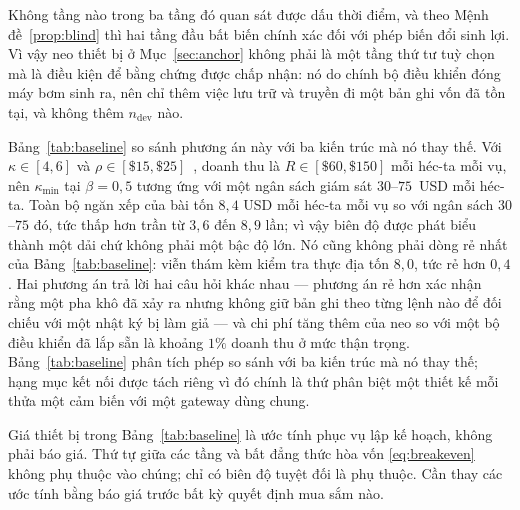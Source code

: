Không tầng nào trong ba tầng đó quan sát được dấu thời điểm, và theo
Mệnh đề~\ref{prop:blind} thì hai tầng đầu bất biến chính xác đối với phép biến đổi sinh
lợi. Vì vậy neo thiết bị ở Mục~\ref{sec:anchor} không phải là một tầng thứ tư tuỳ chọn
mà là điều kiện để bằng chứng được chấp nhận: nó do chính bộ điều khiển đóng máy bơm
sinh ra, nên chỉ thêm việc lưu trữ và truyền đi một bản ghi vốn đã tồn tại, và không
thêm $n_{\mathrm{dev}}$ nào.

Bảng~\ref{tab:baseline} so sánh phương án này với ba kiến trúc mà nó thay thế. Với
$\kappa\in[4,6]$ và $\rho\in[\$15,\$25]$~\cite{rmi2025rice,upstream2026price}, doanh thu
là $R\in[\$60,\$150]$ mỗi héc-ta mỗi vụ, nên $\kappa_{\min}$ tại $\beta=0{,}5$ tương ứng
với một ngân sách giám sát $30$--$75$~USD mỗi héc-ta. Toàn bộ ngăn xếp của bài tốn
$8{,}4$ USD mỗi héc-ta mỗi vụ so với ngân sách $30$--$75$ đó, tức thấp hơn trần từ
$3{,}6$ đến $8{,}9$ lần; vì vậy biên độ được phát biểu thành một dải chứ không phải một
bậc độ lớn. Nó cũng không phải dòng rẻ nhất của Bảng~\ref{tab:baseline}: viễn thám kèm
kiểm tra thực địa tốn $8{,}0$, tức rẻ hơn $0{,}4$. Hai phương án trả lời hai câu hỏi
khác nhau --- phương án rẻ hơn xác nhận rằng một pha khô đã xảy ra nhưng không giữ bản
ghi theo từng lệnh nào để đối chiếu với một nhật ký bị làm giả --- và chi phí tăng thêm
của neo so với một bộ điều khiển đã lắp sẵn là khoảng $1\%$ doanh thu ở mức thận trọng.
Bảng~\ref{tab:baseline} phân tích phép so sánh với ba kiến trúc mà nó thay thế; hạng mục
kết nối được tách riêng vì đó chính là thứ phân biệt một thiết kế mỗi thửa một cảm biến
với một gateway dùng chung.

\begin{remark}
Giá thiết bị trong Bảng~\ref{tab:baseline} là ước tính phục vụ lập kế hoạch, không phải
báo giá. Thứ tự giữa các tầng và bất đẳng thức hòa vốn \eqref{eq:breakeven} không phụ
thuộc vào chúng; chỉ có biên độ tuyệt đối là phụ thuộc. Cần thay các ước tính bằng báo
giá trước bất kỳ quyết định mua sắm nào.
\end{remark}

